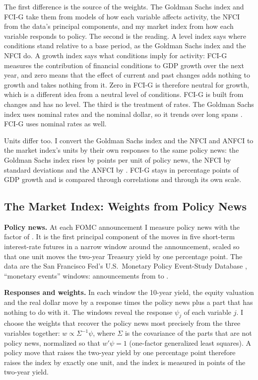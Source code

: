 \documentclass[11pt]{article}
\begin{document}
The first difference is the source of the weights. The Goldman Sachs index and FCI-G take them from models of how each variable affects activity, the NFCI from the data's principal components, and my market index from how each variable responds to policy. The second is the reading. A level index says where conditions stand relative to a base period, as the Goldman Sachs index and the NFCI do. A growth index says what conditions imply for activity: FCI-G measures the contribution of financial conditions to GDP growth over the next year, and zero means that the effect of current and past changes adds nothing to growth and takes nothing from it. Zero in FCI-G is therefore neutral for growth, which is a different idea from a neutral level of conditions. FCI-G is built from changes and has no level. The third is the treatment of rates. The Goldman Sachs index uses nominal rates and the nominal dollar, so it trends over long spans \citep{hatzius2010}. FCI-G uses nominal rates as well.

Units differ too. I convert the Goldman Sachs index and the NFCI and ANFCI to the market index's units by their own responses to the same policy news: the Goldman Sachs index rises by  points per unit of policy news, the NFCI by  standard deviations and the ANFCI by . FCI-G stays in percentage points of GDP growth and is compared through correlations and through its own scale.

\subsection{The Market Index: Weights from Policy News}\label{sec:market}
\textbf{Policy news.} At each FOMC announcement I measure policy news with the factor of \citet{nakamura2018}. It is the first principal component of the moves in five short-term interest-rate futures in a narrow window around the announcement, scaled so that one unit moves the two-year Treasury yield by one percentage point. The data are the San Francisco Fed's U.S.\ Monetary Policy Event-Study Database \citep{acosta2025}, ``monetary events'' windows:  announcements from  to .

\textbf{Responses and weights.} In each window the 10-year yield, the equity valuation and the real dollar move by a response times the policy news plus a part that has nothing to do with it. The windows reveal the response $\psi_j$ of each variable $j$. I choose the weights that recover the policy news most precisely from the three variables together: $w\propto\Sigma^{-1}\psi$, where $\Sigma$ is the covariance of the parts that are not policy news, normalized so that $w'\psi=1$ (one-factor generalized least squares). A policy move that raises the two-year yield by one percentage point therefore raises the index by exactly one unit, and the index is measured in points of the two-year yield.
\end{document}
